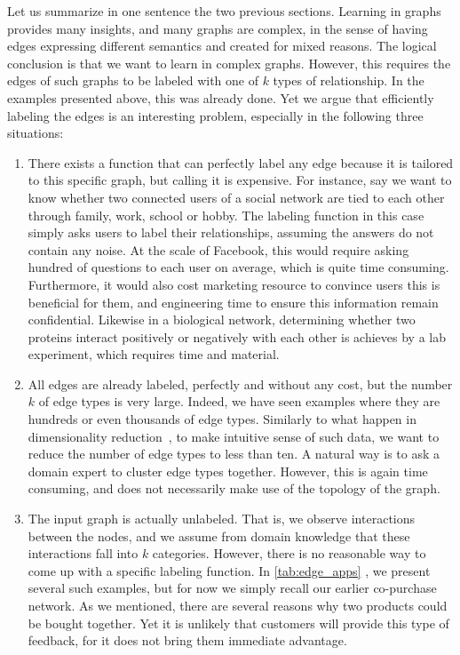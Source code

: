 Let us summarize in one sentence the two previous sections. Learning in graphs provides many
insights, and many graphs are complex, in the sense of having edges expressing different semantics
and created for mixed reasons. The logical conclusion is that we want to learn in complex graphs.
However, this requires the edges of such graphs to be labeled with one of $k$ types of relationship.
In the examples presented above, this was already done. Yet we argue that efficiently labeling the
edges is an interesting problem, especially in the following three situations:

\begin{enumerate}

  \item There exists a function that can perfectly label any edge because it is tailored to this
    specific graph, but calling it is expensive. For instance, say we want to know whether two
    connected users of a social network are tied to each other through family, work, school or
    hobby. The labeling function in this case simply asks users to label their relationships,
    assuming the answers do not contain any noise. At the scale of Facebook, this would require
    asking hundred of questions to each user on average, which is quite time consuming. Furthermore,
    it would also cost marketing resource to convince users this is beneficial for them, and
    engineering time to ensure this information remain confidential. Likewise in a biological
    network, determining whether two proteins interact positively or negatively with each other is
    achieves by a lab experiment, which requires time and material.

  \item All edges are already labeled, perfectly and without any cost, but the number $k$ of edge
    types is very large. Indeed, we have seen examples where they are hundreds or even thousands of
    edge types. Similarly to what happen in dimensionality
    reduction~\autocite{DimensionReduction10}, to make intuitive sense of such data, we want to
    reduce the number of edge types to less than ten. A natural way is to ask a domain expert to
    cluster edge types together. However, this is again time consuming, and does not necessarily
    make use of the topology of the graph.

  \item The input graph is actually unlabeled. That is, we observe interactions between the nodes,
    and we assume from domain knowledge that these interactions fall into $k$ categories. However,
    there is no reasonable way to come up with a specific labeling function. In
    \autoref{tab:edge_apps} , we present several such examples, but for now
    we simply recall our earlier co-purchase network. As we mentioned, there are several reasons why
    two products could be bought together. Yet it is unlikely that customers will provide this type
    of feedback, for it does not bring them immediate advantage.
\end{enumerate}

